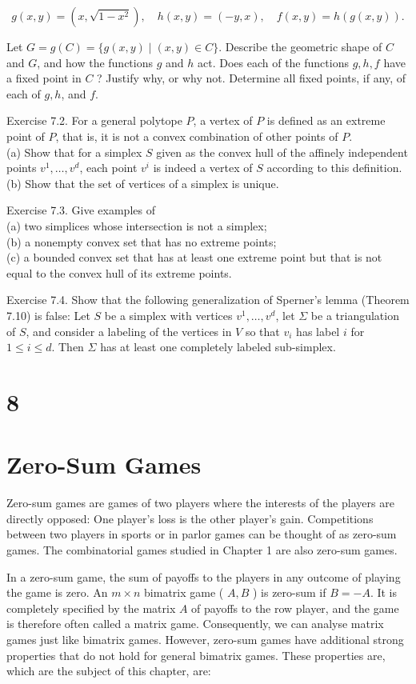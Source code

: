 \documentclass[12pt]{article}
\begin{document}
$$
g(x, y)=\left(x, \sqrt{1-x^{2}}\right), \quad h(x, y)=(-y, x), \quad f(x, y)=h(g(x, y)) .
$$

Let $G=g(C)=\{g(x, y) \mid(x, y) \in C\}$. Describe the geometric shape of $C$ and $G$, and how the functions $g$ and $h$ act. Does each of the functions $g, h, f$ have a fixed point in $C$ ? Justify why, or why not. Determine all fixed points, if any, of each of $g, h$, and $f$.

Exercise 7.2. For a general polytope $P$, a vertex of $P$ is defined as an extreme point of $P$, that is, it is not a convex combination of other points of $P$.\\
(a) Show that for a simplex $S$ given as the convex hull of the affinely independent points $v^{1}, \ldots, v^{d}$, each point $v^{i}$ is indeed a vertex of $S$ according to this definition.\\
(b) Show that the set of vertices of a simplex is unique.

Exercise 7.3. Give examples of\\
(a) two simplices whose intersection is not a simplex;\\
(b) a nonempty convex set that has no extreme points;\\
(c) a bounded convex set that has at least one extreme point but that is not equal to the convex hull of its extreme points.

Exercise 7.4. Show that the following generalization of Sperner's lemma (Theorem 7.10) is false: Let $S$ be a simplex with vertices $v^{1}, \ldots, v^{d}$, let $\Sigma$ be a triangulation of $S$, and consider a labeling of the vertices in $V$ so that $v_{i}$ has label $i$ for $1 \leq i \leq d$. Then $\Sigma$ has at least one completely labeled sub-simplex.

\section*{8}
\section*{Zero-Sum Games}
Zero-sum games are games of two players where the interests of the players are directly opposed: One player's loss is the other player's gain. Competitions between two players in sports or in parlor games can be thought of as zero-sum games. The combinatorial games studied in Chapter 1 are also zero-sum games.

In a zero-sum game, the sum of payoffs to the players in any outcome of playing the game is zero. An $m \times n$ bimatrix game ( $A, B$ ) is zero-sum if $B=-A$. It is completely specified by the matrix $A$ of payoffs to the row player, and the game is therefore often called a matrix game. Consequently, we can analyse matrix games just like bimatrix games. However, zero-sum games have additional strong properties that do not hold for general bimatrix games. These properties are, which are the subject of this chapter, are:
\end{document}
